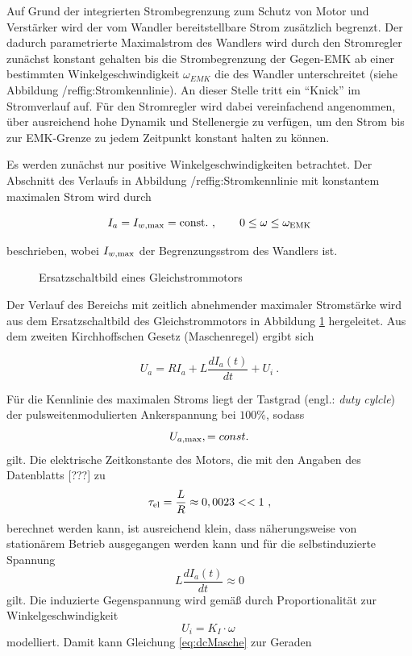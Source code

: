 Auf Grund der integrierten Strombegrenzung zum Schutz von Motor und Verstärker wird der vom Wandler bereitstellbare Strom zusätzlich begrenzt. Der dadurch parametrierte Maximalstrom des Wandlers wird durch den Stromregler zunächst konstant gehalten bis die Strombegrenzung der Gegen-EMK ab einer bestimmten Winkelgeschwindigkeit $\omega_{EMK}$ die des Wandler unterschreitet (siehe Abbildung /ref{fig:Stromkennlinie}). An dieser Stelle tritt ein "`Knick"' im Stromverlauf auf. Für den Stromregler wird dabei vereinfachend angenommen, über ausreichend hohe Dynamik und Stellenergie zu verfügen, um den Strom bis zur EMK-Grenze zu jedem Zeitpunkt konstant halten zu können.

Es werden zunächst nur positive Winkelgeschwindigkeiten betrachtet. 
Der Abschnitt des Verlaufs in Abbildung /ref{fig:Stromkennlinie} mit konstantem maximalen Strom wird durch

\begin{equation}
	I_a  = I_{w\mrm{, max}} = \mrm{const.} \ , \qquad 0 \leq \omega \leq \omega_{\mrm{EMK}}
	\label{eq:Iconst}
\end{equation}

beschrieben, wobei $I_{w\mathrm{, max}}$ der Begrenzungsstrom des Wandlers ist.

\begin{figure}[h]
	\centering
		
	\caption{Ersatzschaltbild eines Gleichstrommotors}
	\label{fig:dcESB}
\end{figure}

Der Verlauf des Bereichs mit zeitlich abnehmender maximaler Stromstärke wird aus dem Ersatzschaltbild des Gleichstrommotors in Abbildung \ref{fig:dcESB} hergeleitet. Aus dem zweiten Kirchhoffschen Gesetz (Maschenregel) ergibt sich

\begin{equation}
	U_a =  RI_a + L \frac{dI_a(t)}{dt} + U_i \ . 
	\label{eq:dcMasche}
\end{equation}

Für die Kennlinie des maximalen Stroms liegt der Tastgrad (engl.: \textit{duty cylcle}) der pulsweitenmodulierten Ankerspannung bei $100\%$, sodass 
\[
	U_{a \mathrm{, max}},  = const.
\]
gilt. Die elektrische Zeitkonstante des Motors, die mit den Angaben des Datenblatts [???] zu 
\[
	\tau_{\mathrm{el}} = \frac{L}{R} \approx 0,0023 << 1 \ ,
\]
berechnet werden kann, ist ausreichend klein, dass näherungsweise von stationärem Betrieb ausgegangen werden kann und für die selbstinduzierte Spannung 
\[
	L \frac{dI_a(t)}{dt} \approx 0
\]
gilt. Die induzierte Gegenspannung wird gemäß \cite{binder} durch Proportionalität zur Winkelgeschwindigkeit
\[
	U_i  = K_I \cdot \omega \ 
\]
modelliert.
Damit kann Gleichung \eqref{eq:dcMasche} zur Geraden

